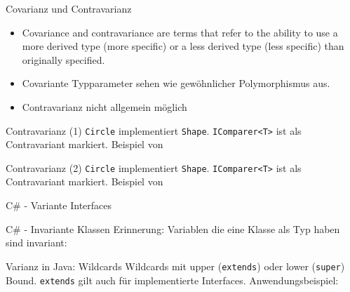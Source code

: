 \documentclass[11pt]{beamer}
\begin{document}
\begin{frame}{Covarianz und Contravarianz}
	\begin{itemize}
		\item \glqq Covariance and contravariance are terms that refer to the ability to use a more derived type (more specific) or a less derived type (less specific) than originally specified.\grqq{} \cite{csharp_docs_variance}
		\item Covariante Typparameter  sehen wie \glqq gewöhnlicher\grqq{} Polymorphismus aus.
		\item Contravarianz nicht allgemein möglich
	\end{itemize}

\end{frame}

\begin{frame}{Contravarianz (1)}
\tiny{
\texttt{Circle} implementiert \texttt{Shape}. \texttt{IComparer<T>} ist als Contravariant markiert.}
Beispiel von \cite{csharp_example_contravariance}
\end{frame}

\begin{frame}{Contravarianz (2)}
\tiny{
\texttt{Circle} implementiert \texttt{Shape}. \texttt{IComparer<T>} ist als Contravariant markiert.}
Beispiel von \cite{csharp_example_contravariance}
\end{frame}


\begin{frame}{C\# - Variante Interfaces}
\end{frame}


\begin{frame}{C\# - Invariante Klassen}
	Erinnerung: 
	Variablen die eine Klasse als Typ haben sind invariant:
\end{frame}

\begin{frame}{Varianz in Java: Wildcards}
		Wildcards mit upper (\texttt{extends}) oder lower (\texttt{super}) Bound. \texttt{extends} gilt auch für implementierte Interfaces.
		Anwendungsbeispiel:
\end{frame}
\end{document}
